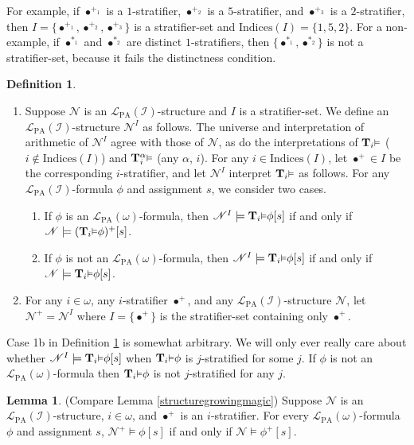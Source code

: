\documentclass[reqno]{article}
\theoremstyle{definition}
\newtheorem{lemma}[theorem]{Lemma}
\newtheorem{definition}[theorem]{Definition}
\def\L{\mathscr{L}}
\def\T{\mathbf{T}}
\def\indices{\mathrm{Indices}}
\def\LPA{\L_{\mathrm{PA}}}
\def\indset{\mathcal I}
\renewcommand{\Pr}[1]{\T_{#1}\mbox{\small${\vDash}$}}
\newcommand{\Prr}[2]{\T^{#1}_{#2}\mbox{\small${\vDash}$}}
\begin{document}
For example, if $\bullet^{+_1}$ is a $1$-stratifier,
$\bullet^{+_2}$ is a $5$-stratifier, and $\bullet^{+_3}$ is a $2$-stratifier,
then $I=\{\bullet^{+_1},\bullet^{+_2},\bullet^{+_3}\}$ is a stratifier-set
and $\indices(I)=\{1,5,2\}$. For a non-example, if $\bullet^{*_1}$ and $\bullet^{*_2}$
are distinct $1$-stratifiers, then $\{\bullet^{*_1},\bullet^{*_2}\}$ is
not a stratifier-set, because it fails the distinctness condition.

\begin{definition}
\label{moduloidefn}
\item
\begin{enumerate}
\item
Suppose $\mathscr N$ is an $\LPA(\indset)$-structure
and $I$ is a stratifier-set.
We define an $\LPA(\indset)$-structure $\mathscr N^I$
as follows.
The universe and interpretation of arithmetic of $\mathscr N^I$
agree with those of $\mathscr N$,
as do the interpretations of $\Pr i$ ($i\not\in\indices(I)$)
and $\Prr\alpha i$ (any $\alpha$, $i$).
For any $i\in\indices(I)$, let $\bullet^+\in I$ be the corresponding
$i$-stratifier, and let $\mathscr N^I$ interpret $\Pr i$ as follows.
For any $\LPA(\indset)$-formula $\phi$ and assignment $s$,
we consider two cases.
\begin{enumerate}
  \item If $\phi$ is an $\LPA(\omega)$-formula, then
  $\mathscr N^I \models \Pr i\phi[s]$ if and only if $\mathscr N\models (\Pr i\phi)^+[s]$.
  \item If $\phi$ is not an $\LPA(\omega)$-formula, then
  $\mathscr N^I \models \Pr i\phi[s]$ if and only if $\mathscr N\models \Pr i\phi[s]$.
\end{enumerate}
\item
For any $i\in\omega$, any $i$-stratifier $\bullet^+$, and any
$\LPA(\indset)$-structure $\mathscr N$,
let $\mathscr N^+=\mathscr N^I$ where $I=\{\bullet^+\}$
is the stratifier-set containing only $\bullet^+$.
\end{enumerate}
\end{definition}

Case 1b in Definition \ref{moduloidefn} is somewhat arbitrary.
We will only ever really care about whether
$\mathscr N^I \models \Pr i\phi[s]$ when $\Pr i\phi$ is $j$-stratified for some $j$.
If $\phi$ is not an $\LPA(\omega)$-formula then $\Pr i\phi$ is not $j$-stratified for any $j$.

\begin{lemma}
\label{structurecollapsingmagic}
(Compare Lemma \ref{structuregrowingmagic})
Suppose $\mathscr N$ is an $\LPA(\indset)$-structure, $i\in\omega$, and $\bullet^+$
is an $i$-stratifier.
For every $\LPA(\omega)$-formula $\phi$ and assignment $s$,
$\mathscr N^+\models\phi[s]$ if and only if $\mathscr N\models\phi^+[s]$.
\end{lemma}
\end{document}
